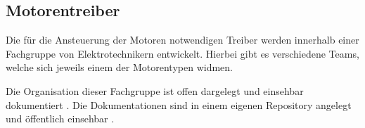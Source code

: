 \subsection{Motorentreiber}
Die für die Ansteuerung der Motoren notwendigen Treiber werden innerhalb
einer Fachgruppe von Elektrotechnikern entwickelt. Hierbei gibt es
verschiedene Teams, welche sich jeweils einem der Motorentypen widmen.

Die Organisation dieser Fachgruppe ist offen dargelegt und einsehbar
dokumentiert \cite{pren-et}. Die Dokumentationen sind in einem eigenen
Repository angelegt und öffentlich einsehbar \cite{pren-et-doc}.
